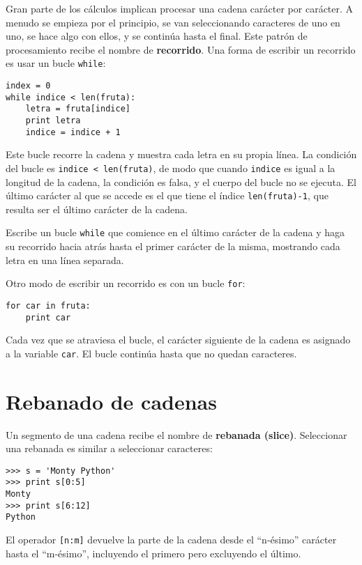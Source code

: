 Gran parte de los cálculos implican procesar una cadena carácter por
carácter. A menudo se empieza por el principio, se van seleccionando caracteres
de uno en uno, se hace algo con ellos, y se continúa hasta el final. Este patrón
de procesamiento recibe el nombre de {\bf recorrido}. Una forma de escribir un recorrido
es usar un bucle {\tt while}:

\beforeverb
\begin{verbatim}
index = 0
while indice < len(fruta):
    letra = fruta[indice]
    print letra
    indice = indice + 1
\end{verbatim}
\afterverb
%
Este bucle recorre la cadena y muestra cada letra en su propia línea.
La condición del bucle es {\tt indice < len(fruta)}, de modo
que cuando {\tt indice} es igual a la longitud de la cadena, la
condición es falsa, y el cuerpo del bucle no se ejecuta. El
último carácter al que se accede es el que tiene el índice {\tt len(fruta)-1},
que resulta ser el último carácter de la cadena.

\begin{ex}
Escribe un bucle {\tt while} que comience en el último carácter de la cadena
y haga su recorrido hacia atrás hasta el primer carácter de la misma,
mostrando cada letra en una línea separada.
\end{ex}

Otro modo de escribir un recorrido es con un bucle {\tt for}:

\beforeverb
\begin{verbatim}
for car in fruta:
    print car
\end{verbatim}
\afterverb
%
Cada vez que se atraviesa el bucle, el carácter siguiente de la cadena es asignado
a la variable {\tt car}. El bucle continúa hasta que no quedan caracteres.


\section{Rebanado de cadenas}
\label{slice}


Un segmento de una cadena recibe el nombre de {\bf rebanada (slice)}.
Seleccionar una rebanada es similar a seleccionar caracteres:

\beforeverb
\begin{verbatim}
>>> s = 'Monty Python'
>>> print s[0:5]
Monty
>>> print s[6:12]
Python
\end{verbatim}
\afterverb
%
El operador {\tt [n:m]} devuelve la parte de la cadena desde el
``n-ésimo'' carácter hasta el ``m-ésimo'', incluyendo el primero
pero excluyendo el último.

